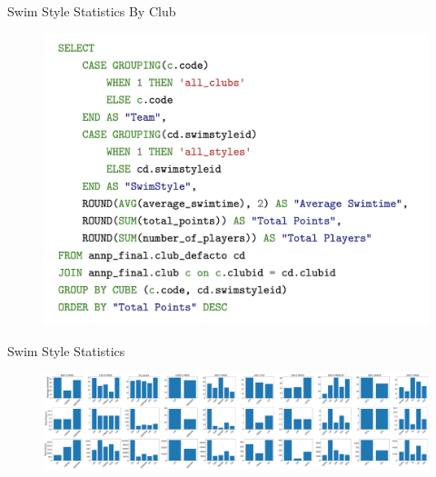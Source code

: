 \documentclass[aspectratio=169, xcolor=dvipsnames]{beamer}
\begin{document}
\begin{frame}{Swim Style Statistics By Club}

\begin{figure}
    \includegraphics[scale=0.25]{img/clubs-stats-swim.png}\hspace*{10cm}
\end{figure}

\end{frame}

\begin{frame}{Swim Style Statistics}
\begin{figure}
    \centering
    \includegraphics[width=\textwidth]{img/stats_clubs_swim.pdf}
\end{figure}
\end{frame}
\end{document}
